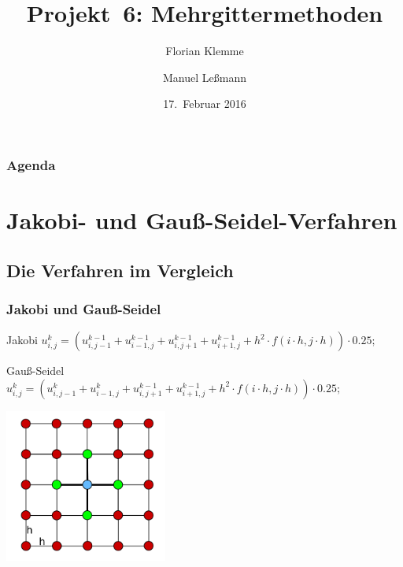 \documentclass{beamer}
\begin{document}
\title{Projekt~6: Mehrgittermethoden}
\author{Florian Klemme \and Manuel Leßmann}
\date{17.~Februar 2016}

\begin{frame}
    \titlepage
\end{frame}

\begin{frame}
    \tableofcontents
    \frametitle{Agenda}
\end{frame}

\section{Jakobi- und Gauß-Seidel-Verfahren}
\subsection{Die Verfahren im Vergleich}
\begin{frame}
    \frametitle{Jakobi und Gauß-Seidel}
    \begin{block}{Jakobi}
        \(u_{i,j}^{k} = (u_{i,j-1}^{k-1} + u_{i-1,j}^{k-1}
                       + u_{i,j+1}^{k-1} + u_{i+1,j}^{k-1}
                       + h^2 \cdot f(i \cdot h, j \cdot h)) \cdot 0.25;\)
    \end{block}
    \begin{block}{Gauß-Seidel}
        \(u_{i,j}^{k} = (u_{i,j-1}^{k} + u_{i-1,j}^{k}
                       + u_{i,j+1}^{k-1} + u_{i+1,j}^{k-1}
                       + h^2 \cdot f(i \cdot h, j \cdot h)) \cdot 0.25;\)
    \end{block}
    \begin{center}
        \includegraphics[width=0.4\textwidth]{jakobi-grid}
    \end{center}
\end{frame}
\end{document}

